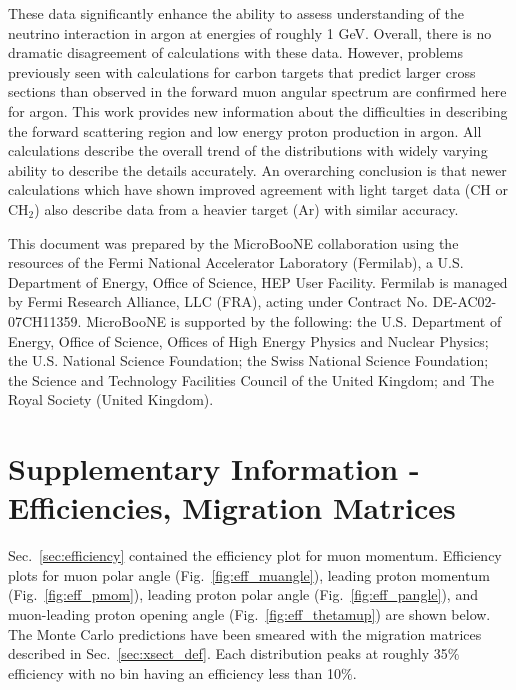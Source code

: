 \documentclass[%
twocolumn,
 amsmath,amssymb,
 aps,
prd,
superscriptaddress,showpacs]{revtex4-2}
\begin{document}
These data significantly enhance the ability to assess understanding of the neutrino interaction in argon at energies of roughly 1 GeV.
Overall, there is no dramatic disagreement of  calculations with these data.
However, problems previously seen with calculations for carbon targets that predict larger cross sections than observed in the forward muon angular spectrum are confirmed here for argon.
This work provides new information about the difficulties in describing the forward scattering region and low energy proton production in argon.
All calculations describe the overall trend of the distributions with widely varying ability to describe the details accurately. 
An overarching conclusion is that newer calculations which have shown improved agreement with light target data (CH or CH$_2$) also describe data from a heavier target (Ar) with similar accuracy.
\FloatBarrier

\begin{acknowledgments}
This document was prepared by the MicroBooNE collaboration using the resources of the Fermi National Accelerator Laboratory (Fermilab), a U.S. Department of Energy, Office of Science, HEP User Facility. Fermilab is managed by Fermi Research Alliance, LLC (FRA), acting under Contract No. DE-AC02- 07CH11359. MicroBooNE is supported by the following: the U.S. Department of Energy, Office of Science, Offices of High Energy Physics and Nuclear Physics; the U.S. National Science Foundation; the Swiss National Science Foundation; the Science and Technology Facilities Council of the United Kingdom; and The Royal Society (United Kingdom).

\end{acknowledgments}

\appendix

\section{Supplementary Information - Efficiencies, Migration Matrices}
Sec.~\ref{sec:efficiency} contained the efficiency plot for muon momentum.  
Efficiency plots for muon polar angle (Fig.~\ref{fig:eff_muangle}), leading proton momentum (Fig.~\ref{fig:eff_pmom}),
leading proton polar angle (Fig.~\ref{fig:eff_pangle}), and muon-leading proton opening angle (Fig.~\ref{fig:eff_thetamup}) are shown below.
The Monte Carlo predictions have been smeared with the migration matrices described in Sec.~\ref{sec:xsect_def}.
Each distribution peaks at roughly 35\% efficiency with no bin having an efficiency less than 10\%.
\end{document}
